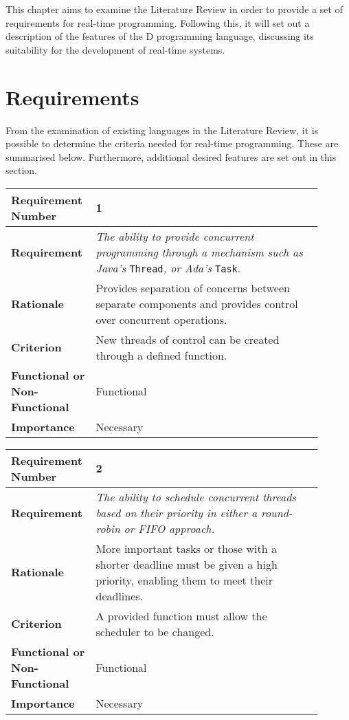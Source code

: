
This chapter aims to examine the Literature Review in order to provide a set of 
requirements for real-time programming. Following this, it will set out a 
description of the features of the D programming language, discussing its 
suitability for the development of real-time systems.

\section{Requirements}
From the examination of existing languages in the Literature Review, it is possible 
to determine the criteria needed for real-time programming. These are 
summarised below. Furthermore, additional desired features are set out 
in this section. 
\begin{table}[!h]
\centering
\begin{tabular}{|L{0.2\linewidth}|L{0.7\linewidth}|}
\hline
\textbf{Requirement Number} & 1 \\ \hline
\textbf{Requirement} & \emph{The ability to provide concurrent programming through a 
mechanism such as Java's} \texttt{Thread}\emph{, or Ada's} \texttt{Task}. \\ \hline
\textbf{Rationale}      & Provides separation of concerns between separate components
and provides control over concurrent operations. \\ \hline
\textbf{Criterion}      & New threads of control can be created through a defined 
function. \\ \hline
\textbf{Functional or Non-Functional} & Functional \\ \hline
\textbf{Importance}     & Necessary \\ \hline
\end{tabular}
\end{table}
\begin{table}[!h]
\centering
\begin{tabular}{|L{0.2\linewidth}|L{0.7\linewidth}|}
\hline
\textbf{Requirement Number} & 2 \\ \hline
\textbf{Requirement} & \emph{The ability to schedule concurrent threads based on their priority in 
                either a round-robin or FIFO approach.}\\ \hline
\textbf{Rationale}      & More important tasks or those with a shorter deadline
                must be given a high priority, enabling them to meet their 
                deadlines. \\ \hline
\textbf{Criterion}      & A provided function must allow the scheduler to be changed. \\ \hline
\textbf{Functional or Non-Functional} & Functional \\ \hline
\textbf{Importance}     & Necessary \\ \hline
\end{tabular}
\end{table}
